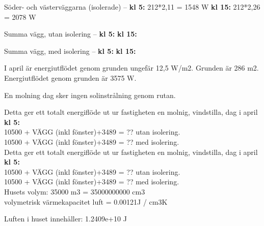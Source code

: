 Söder- och västerväggarna (isolerade) –
\textbf{kl 5:} 212*2,11 = 1548 W
\textbf{kl 15:} 212*2,26 = 2078 W

Summa vägg, utan isolering –
\textbf{kl 5:} 
\textbf{kl 15:} 

Summa vägg, med isolering –
\textbf{kl 5:} 
\textbf{kl 15:} 

I april är energiutflödet genom grunden ungefär 12,5 W/m2. Grunden är 286 m2.\\
Energiutflödet genom grunden är 3575 W.

En molning dag sker ingen solinstrålning genom rutan.

Detta ger ett totalt energiflöde ut ur fastigheten en molnig, vindstilla, dag i april \textbf{kl 5:}\\
10500 + VÄGG (inkl fönster)+3489 = ?? utan isolering.\\
10500 + VÄGG (inkl fönster)+3489 = ?? med isolering.\\

Detta ger ett totalt energiflöde ut ur fastigheten en molnig, vindstilla, dag i april \textbf{kl 5:}\\
10500 + VÄGG (inkl fönster)+3489 = ?? utan isolering.\\
10500 + VÄGG (inkl fönster)+3489 = ?? med isolering.\\


Husets volym: 35000 m3 = 35000000000 cm3\\
volymetrisk värmekapacitet luft = 0.00121J / cm3K

Luften i huset innehåller: 1.2409e+10 J

